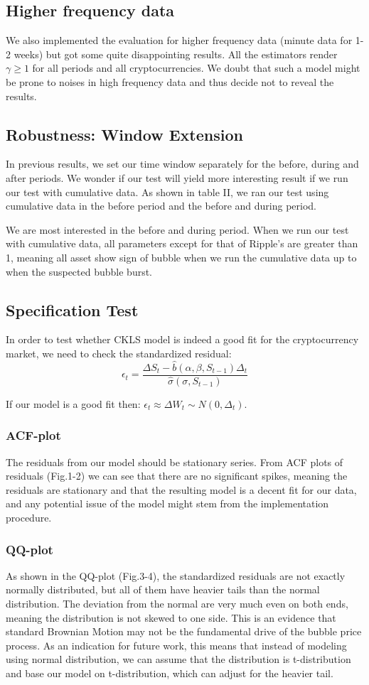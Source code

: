 \begin{spacing}{1.5}
\subsection{Higher frequency data}

We also implemented the evaluation for higher frequency data (minute data for 1-2 weeks) but got some quite disappointing results. All the estimators render $\gamma\geq1$ for all periods and all cryptocurrencies. We doubt that such a model might be prone to noises in high frequency data and thus decide not to reveal the results.  

\subsection{Robustness: Window Extension}
In previous results, we set our time window separately for the before, during and after periods. We wonder if our test will yield more interesting result if we run our test with cumulative data. As shown in table II, we ran our test using cumulative data in the before period and the before and during period.

We are most interested in the before and during period. When we run our test with cumulative data, all parameters except for that of Ripple's are greater than 1, meaning all asset show sign of bubble when we run the cumulative data up to when the suspected bubble burst.

\subsection{Specification Test}
In order to test whether CKLS model is indeed a good fit for the cryptocurrency market, we need to check the standardized residual:
$$
\epsilon_t = \frac{\Delta S_t-\hat{b}(\alpha,\beta,S_{t-1})\Delta_t}{\hat{\sigma}(\sigma,S_{t-1})}
$$

If our model is a good fit then: $\epsilon_t \approx \Delta W_t \sim N(0,\Delta_t)$.
\subsubsection{ACF-plot}
The residuals from our model should be stationary series. From ACF plots of residuals (Fig.1-2) we can see that there are no significant spikes, meaning the residuals are stationary and that the resulting model is a decent fit for our data, and any potential issue of the model might stem from the implementation procedure.
\subsubsection{QQ-plot}
As shown in the QQ-plot (Fig.3-4), the standardized residuals are not exactly normally distributed, but all of them have heavier tails than the normal distribution. The deviation from the normal are very much even on both ends, meaning the distribution is not skewed to one side. This is an evidence that standard Brownian Motion may not be the fundamental drive of the bubble price process. As an indication for future work, this means that instead of modeling using normal distribution, we can assume that the distribution is t-distribution and base our model on t-distribution, which can adjust for the heavier tail. 

\end{spacing}
